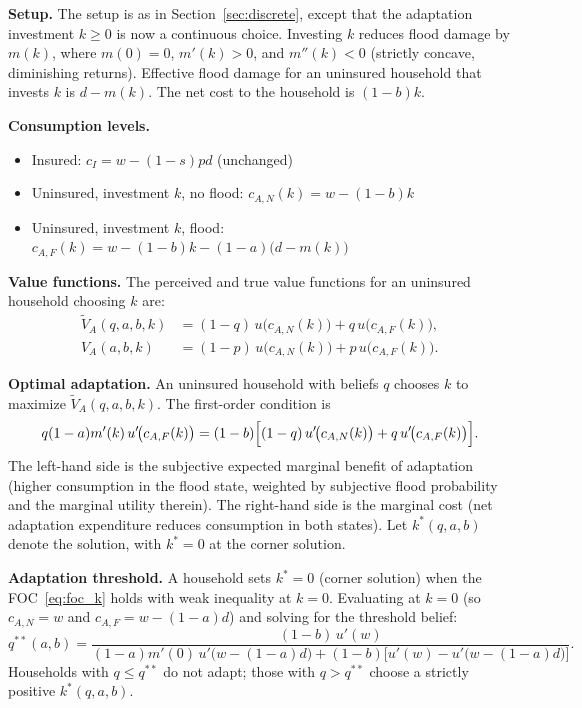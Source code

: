 \documentclass{article}
\begin{document}
\textbf{Setup.} The setup is as in Section~\ref{sec:discrete}, except that the adaptation investment $k \geq 0$ is now a continuous choice. Investing $k$ reduces flood damage by $m(k)$, where $m(0)=0$, $m'(k)>0$, and $m''(k)<0$ (strictly concave, diminishing returns). Effective flood damage for an uninsured household that invests $k$ is $d - m(k)$. The net cost to the household is $(1-b)k$.

\textbf{Consumption levels.}
\begin{itemize}
    \item Insured: $c_I = w - (1-s)pd$ (unchanged)
    \item Uninsured, investment $k$, no flood: $c_{A,N}(k) = w - (1-b)k$
    \item Uninsured, investment $k$, flood: $c_{A,F}(k) = w - (1-b)k - (1-a)\bigl(d-m(k)\bigr)$
\end{itemize}

\textbf{Value functions.} The perceived and true value functions for an uninsured household choosing $k$ are:
\begin{align}
    \tilde{V}_A(q,a,b,k) &= (1-q)\,u\!\bigl(c_{A,N}(k)\bigr) + q\,u\!\bigl(c_{A,F}(k)\bigr), \\
    V_A(a,b,k) &= (1-p)\,u\!\bigl(c_{A,N}(k)\bigr) + p\,u\!\bigl(c_{A,F}(k)\bigr).
\end{align}

\textbf{Optimal adaptation.} An uninsured household with beliefs $q$ chooses $k$ to maximize $\tilde{V}_A(q,a,b,k)$. The first-order condition is
\begin{equation}
    q(1-a)m'(k)\,u'\!\bigl(c_{A,F}(k)\bigr)
    = (1-b)\Bigl[(1-q)\,u'\!\bigl(c_{A,N}(k)\bigr) + q\,u'\!\bigl(c_{A,F}(k)\bigr)\Bigr]. \label{eq:foc_k}
\end{equation}
The left-hand side is the subjective expected marginal benefit of adaptation (higher consumption in the flood state, weighted by subjective flood probability and the marginal utility therein). The right-hand side is the marginal cost (net adaptation expenditure reduces consumption in both states). Let $k^*(q,a,b)$ denote the solution, with $k^* = 0$ at the corner solution.

\textbf{Adaptation threshold.} A household sets $k^* = 0$ (corner solution) when the FOC~\eqref{eq:foc_k} holds with weak inequality at $k=0$. Evaluating at $k=0$ (so $c_{A,N}=w$ and $c_{A,F}=w-(1-a)d$) and solving for the threshold belief:
\begin{equation}
    q^{**}(a,b) = \frac{(1-b)\,u'(w)}{(1-a)m'(0)\,u'\!\bigl(w-(1-a)d\bigr) + (1-b)\bigl[u'(w) - u'\!\bigl(w-(1-a)d\bigr)\bigr]}. \label{eq:qstarstar_cont}
\end{equation}
Households with $q \leq q^{**}$ do not adapt; those with $q > q^{**}$ choose a strictly positive $k^*(q,a,b)$.
\end{document}
